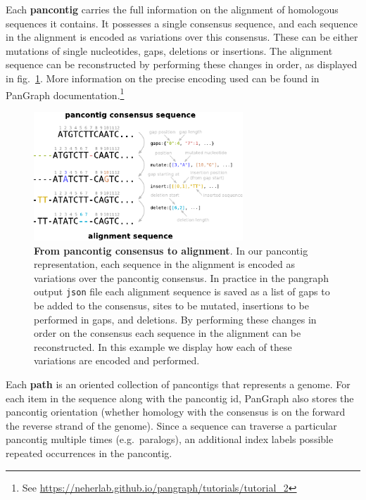 \documentclass[aps,rmp,reprint,superscriptaddress,notitlepage,10pt,onecolumn]{revtex4-1}
\begin{document}
Each \textbf{pancontig} carries the full information on the alignment of homologous sequences it contains. It possesses a single consensus sequence, and each sequence in the alignment is encoded as variations over this consensus. These can be either mutations of single nucleotides, gaps, deletions or insertions. The alignment sequence can be reconstructed by performing these changes in order, as displayed in fig.~\ref{fig:alignment-reconstruction}. More information on the precise encoding used can be found in PanGraph documentation.\footnote{See \url{https://neherlab.github.io/pangraph/tutorials/tutorial_2}}\\

\begin{figure}[tb]
    \includegraphics[width=0.7\textwidth]{figs_suppl/pancontig_alignment.pdf}
    \caption{{\bf From pancontig consensus to alignment}. In our pancontig representation, each sequence in the alignment is encoded as variations over the pancontig consensus. In practice in the pangraph output \texttt{json} file each alignment sequence is saved as a list of gaps to be added to the consensus, sites to be mutated, insertions to be performed in gaps, and deletions. By performing these changes in order on the consensus each sequence in the alignment can be reconstructed. In this example we display how each of these variations are encoded and performed.
    }
    \label{fig:alignment-reconstruction}
\end{figure}

Each \textbf{path} is an oriented collection of pancontigs that represents a genome. For each item in the sequence along with the pancontig id, PanGraph also stores the pancontig orientation (whether homology with the consensus is on the forward the reverse strand of the genome). 
Since a sequence can traverse a particular pancontig multiple times (e.g.~paralogs), an additional index labels possible repeated occurrences in the pancontig. \\
\end{document}
